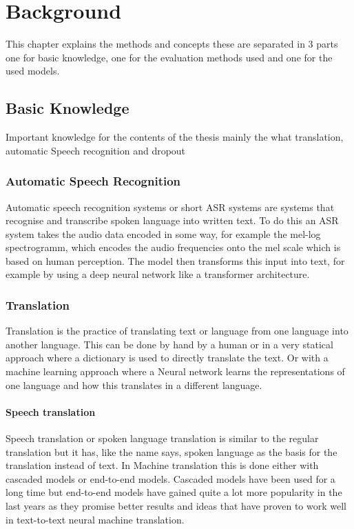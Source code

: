 \chapter{Background}
\label{ch:background}
This chapter explains the methods and concepts these are separated in 3 parts one for basic knowledge, one for the evaluation methods used and one for the used models. 

\section{Basic Knowledge}
Important knowledge for the contents of the thesis mainly the what translation, automatic Speech recognition and dropout


\subsection{Automatic Speech Recognition}
Automatic speech recognition systems or short ASR systems are systems that recognise and transcribe spoken language into written text.
To do this an ASR system takes the audio data encoded in some way, for example the mel-log spectrogramm, which encodes the audio frequencies onto the mel scale which is based on human perception. The model then transforms this input into text, for example by using a deep neural network like a transformer architecture.

\subsection{Translation}
Translation is the practice of translating text or language from one language into another language. This can be done by hand by a human or in a very statical approach where a dictionary is used to directly translate the text. 
Or with a machine learning approach where a Neural network learns the representations of one language and how this translates in a different language. 

\subsubsection{Speech translation}
Speech translation or spoken language translation is similar to the regular translation but it has, like the name says, spoken language as the basis for the translation instead of text. 
In Machine translation this is done either with cascaded models or end-to-end models.
Cascaded models have been used for a long time but end-to-end models have gained quite a lot more popularity in the last years as they promise better results and ideas that have proven to work well in text-to-text neural machine translation.

